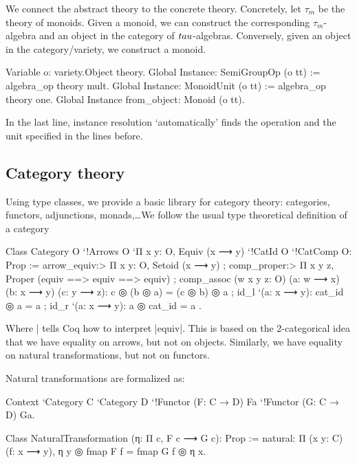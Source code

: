 \documentclass[a4paper,10pt, runningheads]{llncs}
\begin{document}
We connect the abstract theory to the concrete theory. Concretely, let $\tau_m$ be the theory
of monoids. Given a monoid, we can construct the corresponding $\tau_m$-algebra and an
object in the category of $\\tau$-algebras. Conversely, given an object in the category/variety, we
construct a monoid.
\begin{code}
Variable o: variety.Object theory.
Global Instance: SemiGroupOp (o tt) := algebra_op theory mult.
Global Instance: MonoidUnit (o tt) := algebra_op theory one.
Global Instance from_object: Monoid (o tt).
\end{code}
In the last line, instance resolution `automatically' finds the operation and the unit specified in
the lines before.

\subsection{Category theory}\label{cats}
Using type classes, we provide a basic library for category theory: categories, functors,
adjunctions, monads,\ldots We follow the usual type theoretical definition of a
category~\cite{saibi1995constructive}

\begin{code}
Class Category O `{!Arrows O} `{Π x y: O, Equiv (x ⟶ y)}
  `{!CatId O} `{!CatComp O}: Prop :=
  { arrow_equiv:> Π x y: O, Setoid (x ⟶ y)
  ; comp_proper:> Π x y z,
      Proper (equiv ==> equiv ==> equiv)%
  ; comp_assoc (w x y z: O) (a: w ⟶ x) (b: x ⟶ y) (c: y ⟶ z):
      c ◎ (b ◎ a) = (c ◎ b) ◎ a
  ; id_l `(a: x ⟶ y): cat_id ◎ a = a
  ; id_r `(a: x ⟶ y): a ◎ cat_id = a }.
\end{code}
Where |%
tells Coq how to interpret |equiv|.
This is based on the 2-categorical idea that we have equality on arrows, but not on objects.
Similarly, we have equality on natural transformations, but not on functors.

Natural transformations are formalized as:
\begin{code}
  Context `{Category C} `{Category D}
  `{!Functor (F: C → D) Fa} `{!Functor (G: C → D) Ga}.

  Class NaturalTransformation (η: Π c, F c ⟶ G c): Prop :=
    natural: Π (x y: C) (f: x ⟶ y), η y ◎ fmap F f = fmap G f ◎ η x.
\end{code}
\end{document}
